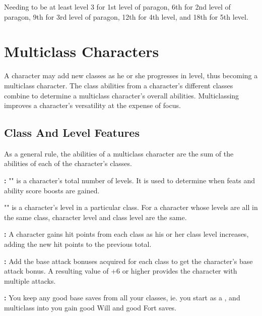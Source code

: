 Needing to be at least level 3 for 1st level of paragon, 6th for 2nd level of paragon, 9th for 3rd level of paragon, 12th for 4th level, and 18th for 5th level.


\pagebreak

\pagebreak

\pagebreak

\pagebreak

\section{Multiclass Characters}

A character may add new classes as he or she progresses in level, thus becoming 
a multiclass character. The class abilities from a character's different classes 
combine to determine a multiclass character's overall abilities. Multiclassing 
improves a character's versatility at the expense of focus.



\subsection{Class And Level Features}

As a general rule, the abilities of a multiclass character are the sum of the abilities 
of each of the character's classes.

\textbf{:} "" is a character's total number of levels. It is used to determine when feats and ability score boosts are gained.

"" is a character's level in a particular class. For a character whose levels are all in the same class, character level and class level are the same.

\textbf{:} A character gains hit points from each class as his or her class level increases, adding the new hit points to the previous total. 

\textbf{:} Add the base attack bonuses acquired for each class to get the character's base attack bonus. A resulting value of +6 or higher provides the character with multiple attacks. 

\textbf{:} You keep any good base saves from all your classes, ie. you start as a , and multiclass into  you gain good Will and good Fort saves.

